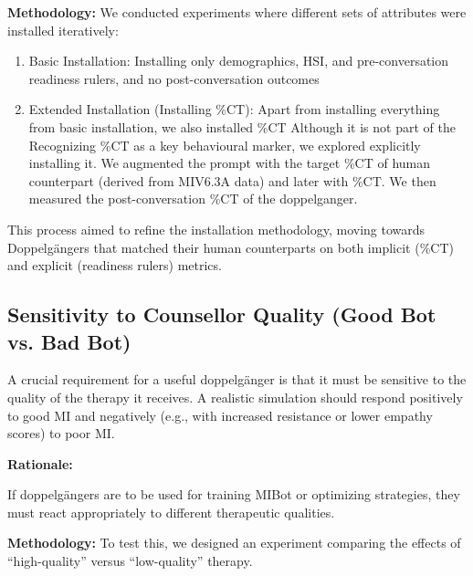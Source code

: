 \textbf{Methodology:}
We conducted experiments where different sets of attributes were installed iteratively:

\begin{enumerate}
    \item Basic Installation: Installing only demographics, HSI, and pre-conversation readiness rulers, and no post-conversation outcomes
    \item Extended Installation (Installing \%CT): Apart from installing everything from basic installation, we also installed \%CT Although it is not part of the Recognizing \%CT as a key behavioural marker, we explored explicitly installing it. We augmented the prompt with the target \%CT of human counterpart (derived from MIV6.3A data) and later with \%CT. We then measured the post-conversation \%CT of the doppelganger. 
\end{enumerate}


This process aimed to refine the installation methodology, moving towards Doppelgängers that matched their human counterparts on both implicit (\%CT) and explicit (readiness rulers) metrics.

\subsection{Sensitivity to Counsellor Quality (Good Bot vs. Bad Bot)}
A crucial requirement for a useful doppelgänger is that it must be sensitive to the quality of the therapy it receives. A realistic simulation should respond positively to good MI and negatively (e.g., with increased resistance or lower empathy scores) to poor MI.

\textbf{Rationale:}

If doppelgängers are to be used for training MIBot or optimizing strategies, they must react appropriately to different therapeutic qualities.

\textbf{Methodology:}
To test this, we designed an experiment comparing the effects of ``high-quality'' versus ``low-quality'' therapy.

